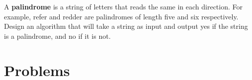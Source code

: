 \begin{exer}
 A {\bfseries palindrome} is a string of letters that reads the same in each direction.
For example, \textsf{refer} and \textsf{redder} are palindromes of length five and six respectively.
Design an algorithm that will take a string as  input and output  \textsf{yes} if the string
is a palindrome, and \textsf{no} if it is not. 
\end{exer}

\clearpage

\section{Problems}
